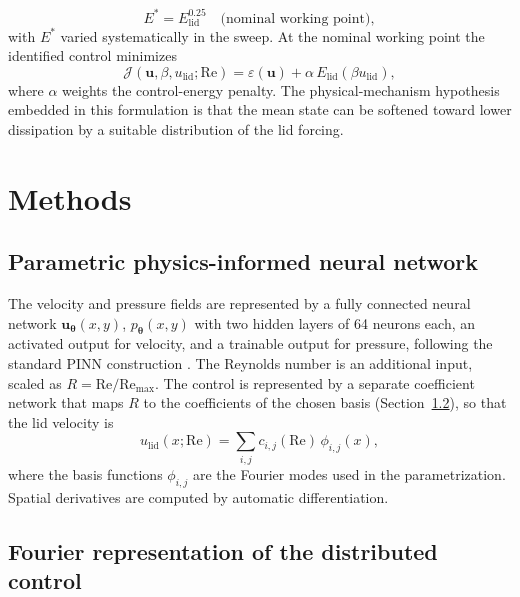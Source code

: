 \documentclass[aip,pof,reprint,superscriptaddress]{revtex4-2}
\newcommand{\re}{\mathrm{Re}}
\begin{document}
\begin{equation}\label{eq:targetenergy}
E^*=E_{\mathrm{lid}}^{0.25}\quad\text{(nominal working point)},
\end{equation}
with $E^*$ varied systematically in the sweep. At the nominal working point the identified control minimizes
\begin{equation}\label{eq:multiobj}
\mathcal{J}(\bm u,\beta,u_{\mathrm{lid}};\re)=\varepsilon(\bm u)+\alpha\,E_{\mathrm{lid}}(\beta u_{\mathrm{lid}}),
\end{equation}
where $\alpha$ weights the control-energy penalty. The physical-mechanism hypothesis embedded in this formulation is that the mean state can be softened toward lower dissipation by a suitable distribution of the lid forcing.

\section{Methods}\label{sec:methods}

\subsection{Parametric physics-informed neural network}

The velocity and pressure fields are represented by a fully connected neural network $\bm u_{\bm\theta}(x,y)$, $p_{\bm\theta}(x,y)$ with two hidden layers of 64 neurons each, an activated output for velocity, and a trainable output for pressure, following the standard PINN construction \cite{raissi2019physics,karniadakis2021physics}. The Reynolds number is an additional input, scaled as $R=\re/\re_{\mathrm{max}}$. The control is represented by a separate coefficient network that maps $R$ to the coefficients of the chosen basis (Section~\ref{sec:fourier}), so that the lid velocity is
\begin{equation}\label{eq:ctrlnet}
u_{\mathrm{lid}}(x;\re)=\sum_{i,j}c_{i,j}(\re)\,\phi_{i,j}(x),
\end{equation}
where the basis functions $\phi_{i,j}$ are the Fourier modes used in the parametrization. Spatial derivatives are computed by automatic differentiation.

\subsection{Fourier representation of the distributed control}\label{sec:fourier}
\end{document}
